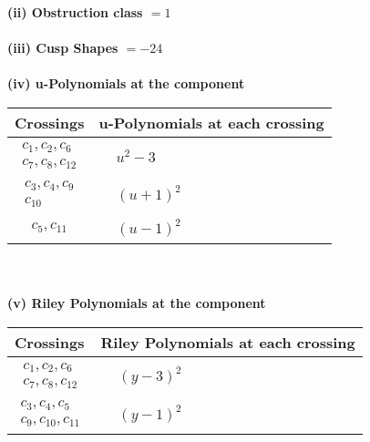 \documentclass[1p]{elsarticle_modified}
\theoremstyle{definition}
\begin{document}
\flushleft \textbf{(ii) Obstruction class $= 1$}\\~\\
\flushleft \textbf{(iii) Cusp Shapes $= -24$}\\~\\
\newpage\renewcommand{\arraystretch}{1}
\flushleft \textbf{(iv) u-Polynomials at the component}\newline \\
\begin{tabular}{m{50pt}|m{274pt}}
Crossings & \hspace{64pt}u-Polynomials at each crossing \\
\hline $$\begin{aligned}c_{1},c_{2},c_{6}\\c_{7},c_{8},c_{12}\end{aligned}$$&$\begin{aligned}
&u^2-3
\end{aligned}$\\
\hline $$\begin{aligned}c_{3},c_{4},c_{9}\\c_{10}\end{aligned}$$&$\begin{aligned}
&(u+1)^2
\end{aligned}$\\
\hline $$\begin{aligned}c_{5},c_{11}\end{aligned}$$&$\begin{aligned}
&(u-1)^2
\end{aligned}$\\
\hline
\end{tabular}\\~\\
\newpage\renewcommand{\arraystretch}{1}
\flushleft \textbf{(v) Riley Polynomials at the component}\newline \\
\begin{tabular}{m{50pt}|m{274pt}}
Crossings & \hspace{64pt}Riley Polynomials at each crossing \\
\hline $$\begin{aligned}c_{1},c_{2},c_{6}\\c_{7},c_{8},c_{12}\end{aligned}$$&$\begin{aligned}
&(y-3)^2
\end{aligned}$\\
\hline $$\begin{aligned}c_{3},c_{4},c_{5}\\c_{9},c_{10},c_{11}\end{aligned}$$&$\begin{aligned}
&(y-1)^2
\end{aligned}$\\
\hline
\end{tabular}\\~\\
\end{document}
